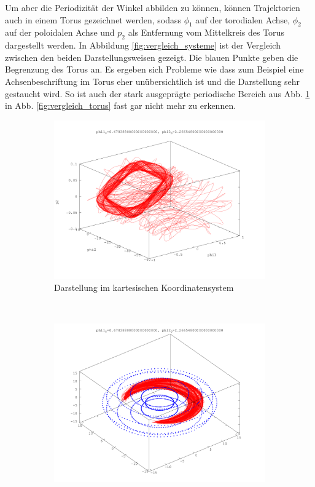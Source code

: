 Um aber die Periodizität der Winkel abbilden zu können, können Trajektorien auch in einem Torus gezeichnet werden, sodass $\phi_1$ auf der torodialen Achse, $\phi_2$ auf der poloidalen Achse und $p_2$ als Entfernung vom Mittelkreis des Torus dargestellt werden.
In Abbildung \ref{fig:vergleich_systeme} ist der Vergleich zwischen den beiden Darstellungsweisen gezeigt.
Die blauen Punkte geben die Begrenzung des Torus an.
Es ergeben sich Probleme wie dass zum Beispiel eine Achsenbeschriftung im Torus eher unübersichtlich ist und die Darstellung sehr gestaucht wird.
So ist auch der stark ausgeprägte periodische Bereich aus Abb. \ref{fig:vergleich_kartesisch} in Abb. \ref{fig:vergleich_torus} fast gar nicht mehr zu erkennen.

\begin{figure}
        \centering
        \begin{subfigure}[b]{0.49\textwidth}
                \centering
                \includegraphics[width=\textwidth]{images/phasenraeume/c_diagonal_16.png}
                \caption{Darstellung im kartesischen Koordinatensystem}
                \label{fig:vergleich_kartesisch}
        \end{subfigure}
        ~
        \begin{subfigure}[b]{0.49\textwidth}
                \centering
                \includegraphics[width=\textwidth]{images/phasenraeume/c_diagonal_16_torus.png}

\end{subfigure}
\end{figure}
